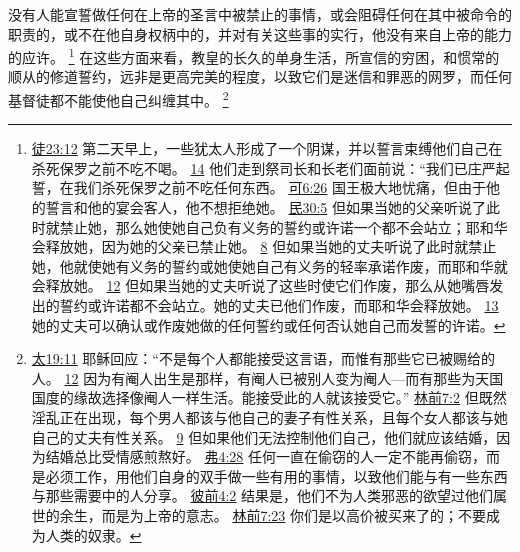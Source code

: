 \documentclass[12pt, a4paper, oneside]{ctexart}
\newcounter{parnum}[section]
\newcommand{\N}{%
   \noindent\refstepcounter{parnum}%
    \makebox[\parindent][l]{\textbf{\arabic{parnum}.}}}
\begin{document}
\N 没有人能宣誓做任何在上帝的圣言中被禁止的事情，或会阻碍任何在其中被命令的职责的，或不在他自身权柄中的，并对有关这些事的实行，他没有来自上帝的能力的应许。
	\footnote {
		\href{https://biblehub.com/acts/23-12.htm}{徒23:12} 第二天早上，一些犹太人形成了一个阴谋，并以誓言束缚他们自己在杀死保罗之前不吃不喝。
		\href{https://biblehub.com/acts/23-14.htm}{14} 他们走到祭司长和长老们面前说：“我们已庄严起誓，在我们杀死保罗之前不吃任何东西。
		\href{https://biblehub.com/mark/6-26.htm}{可6:26} 国王极大地忧痛，但由于他的誓言和他的宴会客人，他不想拒绝她。
		\href{https://biblehub.com/numbers/30-5.htm}{民30:5} 但如果当她的父亲听说了此时就禁止她，那么她使她自己负有义务的誓约或许诺一个都不会站立；耶和华会释放她，因为她的父亲已禁止她。
		\href{https://biblehub.com/numbers/30-8.htm}{8} 但如果当她的丈夫听说了此时就禁止她，他就使她有义务的誓约或她使她自己有义务的轻率承诺作废，而耶和华就会释放她。
		\href{https://biblehub.com/numbers/30-12.htm}{12} 但如果当她的丈夫听说了这些时使它们作废，那么从她嘴唇发出的誓约或许诺都不会站立。她的丈夫已他们作废，而耶和华会释放她。
		\href{https://biblehub.com/numbers/30-13.htm}{13} 她的丈夫可以确认或作废她做的任何誓约或任何否认她自己而发誓的许诺。
	}
	在这些方面来看，教皇的长久的单身生活，所宣信的穷困，和惯常的顺从的修道誓约，远非是更高完美的程度，以致它们是迷信和罪恶的网罗，而任何基督徒都不能使他自己纠缠其中。
	\footnote {
		\href{https://biblehub.com/matthew/19-11.htm}{太19:11} 耶稣回应：“不是每个人都能接受这言语，而惟有那些它已被赐给的人。
		\href{https://biblehub.com/matthew/19-12.htm}{12} 因为有阉人出生是那样，有阉人已被别人变为阉人---而有那些为天国国度的缘故选择像阉人一样生活。能接受此的人就该接受它。”
		\href{https://biblehub.com/1_corinthians/7-2.htm}{林前7:2} 但既然淫乱正在出现，每个男人都该与他自己的妻子有性关系，且每个女人都该与她自己的丈夫有性关系。
		\href{https://biblehub.com/1_corinthians/7-9.htm}{9} 但如果他们无法控制他们自己，他们就应该结婚，因为结婚总比受情感煎熬好。
		\href{https://biblehub.com/ephesians/4-28.htm}{弗4:28} 任何一直在偷窃的人一定不能再偷窃，而是必须工作，用他们自身的双手做一些有用的事情，以致他们能与有一些东西与那些需要中的人分享。
		\href{https://biblehub.com/1_peter/4-2.htm}{彼前4:2} 结果是，他们不为人类邪恶的欲望过他们属世的余生，而是为上帝的意志。
		\href{https://biblehub.com/1_corinthians/7-23.htm}{林前7:23} 你们是以高价被买来了的；不要成为人类的奴隶。
	}
\end{document}
